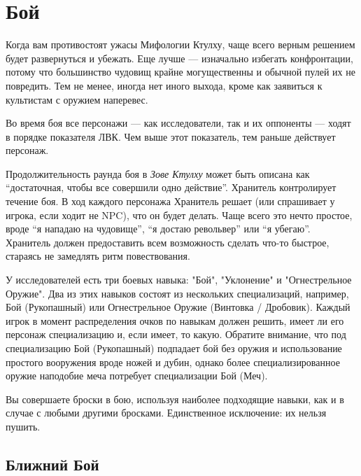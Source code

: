 \documentclass[letterpaper,twocolumn,openany, twoside, 11pt, usenames]{cocbook}
\begin{document}
\section*{Бой}

Когда вам противостоят ужасы Мифологии Ктулху, чаще всего верным решением будет развернуться и убежать. Еще лучше --- изначально избегать конфронтации, потому что большинство чудовищ крайне могущественны и обычной пулей их не повредить. Тем не менее, иногда нет иного выхода, кроме как заявиться к культистам с оружием наперевес.

Во время боя все персонажи --- как исследователи, так и их оппоненты --- ходят в порядке показателя ЛВК. Чем выше этот показатель, тем раньше действует персонаж.

\smallbreak
\noindent {}

Продолжительность раунда боя в {\it Зове Ктулху} может быть описана как ``достаточная, чтобы все совершили одно действие''. Хранитель контролирует течение боя. В ход каждого персонажа Хранитель решает (или спрашивает у игрока, если ходит не NPC), что он будет делать. Чаще всего это нечто простое, вроде ``я нападаю на чудовище'', ``я достаю револьвер'' или ``я убегаю''. Хранитель должен предоставить всем возможность сделать что-то быстрое, стараясь не замедлять ритм повествования.

У исследователей есть три боевых навыка: "Бой", "Уклонение" и "Огнестрельное Оружие". Два из этих навыков состоят из нескольких специализаций, например, Бой (Рукопашный) или Огнестрельное Оружие (Винтовка / Дробовик). Каждый игрок в момент распределения очков по навыкам должен решить, имеет ли его персонаж специализацию и, если имеет, то какую. Обратите внимание, что под специализацию Бой (Рукопашный) подпадает бой без оружия и использование простого вооружения вроде ножей и дубин, однако более специализированное оружие наподобие меча потребует специализации Бой (Меч).

Вы совершаете броски в бою, используя наиболее подходящие навыки, как и в случае с любыми другими бросками. Единственное исключение: их нельзя пушить.

\subsection*{Ближний Бой}
\end{document}
